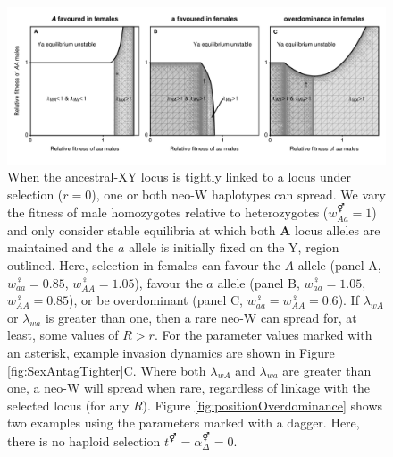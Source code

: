 \documentclass[12pt]{article}
\begin{document}
\begin{figure}[!h]
\centering
\centerline{\includegraphics[width=1.25\linewidth]{Region_plot_combined_Mike}}
\caption{
When the ancestral-XY locus is tightly linked to a locus under selection ($r=0$), one or both neo-W haplotypes can spread. 
We vary the fitness of male homozygotes relative to heterozygotes ($w_{Aa}^\Hermaphrodite=1$) and only consider stable equilibria at which both \textbf{A} locus alleles are maintained and the $a$ allele is initially fixed on the Y, region outlined. 
Here, selection in females can favour the $A$ allele (panel A, $w_{aa}^\female=0.85$, $w_{AA}^\female=1.05$), favour the $a$ allele (panel B, $w_{aa}^\female=1.05$, $w_{AA}^\female=0.85$), or be overdominant (panel C, $w_{aa}^\female=w_{AA}^\female=0.6$). 
If $\lambda_{wA}$ or $\lambda_{wa}$ is greater than one, then a rare neo-W can spread for, at least, some values of $R>r$. 
For the parameter values marked with an asterisk, example invasion dynamics are shown in Figure \ref{fig:SexAntagTighter}C. 
Where both $\lambda_{wA}$ and $\lambda_{wa}$ are greater than one, a neo-W will spread when rare, regardless of linkage with the selected locus (for any $R$). 
Figure \ref{fig:positionOverdominance} shows two examples using the parameters marked with a dagger. 
Here, there is no haploid selection $t^\Hermaphrodite = \alpha^\Hermaphrodite_\Delta = 0$.
}
\label{fig:regionplots}
\end{figure}


\end{document}
